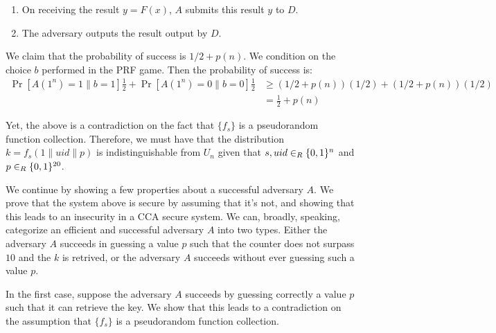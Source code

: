 \documentclass{article}
\begin{document}
\begin{enumerate}[,label=\alph*.]
\begin{enumerate}[noitemsep,topsep=\mdcompacttopsep]
\item{}On receiving the result $y = F(x)$, $A$ submits this result $y$ to $D$.%

\item{}The adversary outputs the result output by $D$.%
\end{enumerate}%

We claim that the probability of success is $1/2 + p(n)$. We condition on the choice $b$ performed
in the PRF game. Then the probability of success is:%
\noindent\noindent\[%
\begin{aligned}
  \Pr[A(1^n) = 1 \| b = 1]\frac{1}{2} + \Pr[A(1^n) = 0 \| b = 0] \frac{1}{2} &\geq (1/2 + p(n))(1/2) + (1/2 + p(n))(1/2) \\
  &= \frac{1}{2} + p(n)
\end{aligned} 
\]%

Yet, the above is a contradiction on the fact that $\{ f_s \}$ is a pseudorandom function collection. Therefore,
we must have that the distribution $k = f_s(1 \| uid \| p)$ is indistinguishable from $U_n$ given that
$s, uid \in_R \{0,1\}^n$ and $p \in_R \{0,1\}^{20}$. 
\mdfloatright{\ensuremath{\Box}}%

We continue by showing a few properties about a successful adversary $A$. We prove that the system
above is secure by assuming that it's not, and showing that this leads to an insecurity in a 
CCA secure system. We can, broadly, speaking, categorize an efficient and successful adversary $A$
into two types. Either the adversary $A$ succeeds in guessing a value $p$ such that the counter
does not surpass $10$ and the $k$ is retrived, or the adversary $A$ succeeds without ever guessing
such a value $p$.%

In the first case, suppose the adversary $A$ succeeds by guessing correctly a value $p$ such 
that it can retrieve the key. We show that this leads to a contradiction on the assumption that 
$\{ f_s\}$ is a pseudorandom function collection.%


\end{enumerate}
\end{document}
